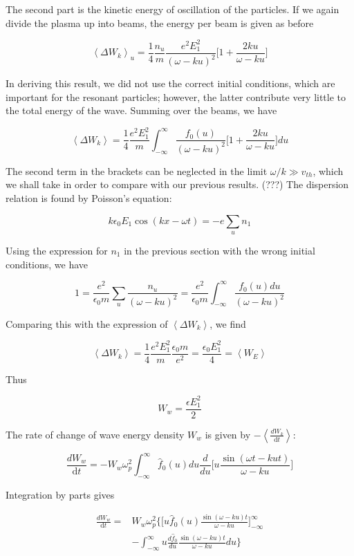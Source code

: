 \documentclass[
  notoc %
]{tufte-book}
\begin{document}
The second part is the kinetic energy of oscillation of the particles.
If we again divide the plasma up into beams, the energy per beam is
given as before

\[
\left<\Delta W_k \right>_u = \frac{1}{4}\frac{n_u}{m} \frac{e^2E_1^2}{(\omega - ku)^2}\Big[ 1+\frac{2ku}{\omega-ku} \Big]
\]

In deriving this result, we did not use the correct initial conditions,
which are important for the resonant particles; however, the latter
contribute very little to the total energy of the wave. Summing over the
beams, we have

\[
\left<\Delta W_k \right> = \frac{1}{4}\frac{e^2E_1^2}{m}\int_{-\infty}^{\infty} \frac{f_0(u)}{(\omega - ku)^2}\Big[ 1+\frac{2ku}{\omega-ku} \Big] du
\]

The second term in the brackets can be neglected in the limit
\(\omega/k \gg v_{th}\), which we shall take in order to compare with
our previous results. (???) The dispersion relation is found by
Poisson's equation:

\[
k\epsilon_0 E_1\cos(kx-\omega t) = -e\sum_u n_1
\]

Using the expression for \(n_1\) in the previous section with the wrong
initial conditions, we have

\[
1 = \frac{e^2}{\epsilon_0 m}\sum_u \frac{n_u}{(\omega-ku)^2} = \frac{e^2}{\epsilon_0 m}\int_{-\infty}^{\infty} \frac{f_0(u)du}{(\omega-ku)^2}
\]

Comparing this with the expression of \(\left< \Delta W_k \right>\), we
find

\[
\left< \Delta W_k \right> = \frac{1}{4}\frac{e^2E_1^2}{m}\frac{\epsilon_0 m}{e^2} = \frac{\epsilon_0 E_1^2}{4} = \left< W_E \right>
\]

Thus

\[
W_w = \frac{\epsilon E_1^2}{2}
\]

The rate of change of wave energy density \(W_w\) is given by
\(-\left< \frac{dW_k}{\mathrm{d}t} \right>\):

\[
\frac{dW_w}{\mathrm{d}t} = -W_w \omega_p^2 \int_{-\infty}^{\infty}\hat{f}_0(u) du \frac{d}{du}\Big[u\frac{\sin(\omega t - kut)}{\omega - ku} \Big]
\]

Integration by parts gives

\[
\begin{aligned}
\frac{dW_w}{\mathrm{d}t} =& W_w \omega_p^2 \Big\{ \Big[ u\hat{f}_0(u)\frac{\sin(\omega-ku)t}{\omega - ku} \Big]_{-\infty}^{\infty} \\
&- \int_{-\infty}^{\infty} u\frac{d\hat{f}_0}{du}\frac{\sin(\omega-ku)t}{\omega-ku} du \Big\}
\end{aligned}
\]
\end{document}
